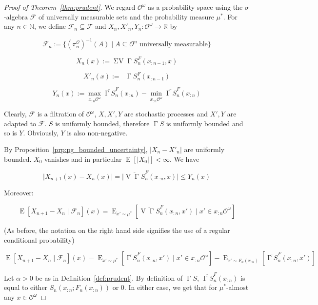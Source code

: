\documentclass[aop,preprint]{imsart}
\numberwithin{equation}{section}
\theoremstyle{definition}
\theoremstyle{plain}
\newcommand{\Nats}{\mathbb{N}}
\newcommand{\Reals}{\mathbb{R}}
\newcommand{\A}[1]{\lvert #1 \rvert}
\DeclareMathOperator{\E}{E}
\newcommand{\Ob}{\mathcal{O}}
\newcommand{\OO}{\Ob^\omega}
\newcommand{\PO}{\pi^\Ob}
\DeclareMathOperator{\V}{V}
\DeclareMathOperator{\SV}{\Sigma V}
\DeclareMathOperator{\SVM}{\Sigma V_{\min}}
\DeclareMathOperator{\PG}{\Gamma}
\newcommand{\F}{\mathcal{F}}
\begin{document}
\begin{proof}[Proof of Theorem~\ref{thm:prudent}]

We regard ${\OO}$ as a probability space using the ${\sigma}$-algebra $\F$ of universally measurable sets and the probability measure ${\mu^*}$. For any ${n \in \Nats}$, we define ${\F_n \subseteq \F}$ and $X_n,X'_n,Y_n: \OO \rightarrow \Reals$ by 

$$\F_n := \{\left(\PO_n\right)^{-1}\left(A\right) \mid A \subseteq \Ob^n \text{ universally measurable}\}$$

$$X_n\left(x\right):= \SV \PG{S}^F_{n}\left(x_{:n-1},x\right)$$

$$X'_n\left(x\right):= \SVM \PG{S}^F_{n}\left(x_{:n-1}\right)$$

$$Y_n\left(x\right):=\max_{x_{:n}\OO} \overline{\PG{S}}^F_{n}\left(x_{:n}\right) - \min_{x_{:n}\OO} \overline{\PG{S}}^F_{n}\left(x_{:n}\right)$$

Clearly, ${\F}$ is a filtration of ${\OO}$, ${X,X',Y}$ are stochastic processes and ${X',Y}$ are adapted to ${\F}$. ${S}$ is uniformly bounded, therefore ${\PG{S}}$  is uniformly bounded and so is ${Y}$. Obviously, ${Y}$ is also non-negative.

By Proposition~\ref{prp:pg_bounded_uncertainty}, ${\A{X_n-X'_n}}$ are uniformly bounded. ${X_0}$ vanishes and in particular ${\E\left[\A{X_0}\right] < \infty}$. We have

$$\A{X_{n+1}\left(x\right)-X_n\left(x\right)} = \A{\overline{\V{\PG{S}}}_{n}^F\left(x_{:n},x\right)} \leq Y_n\left(x\right)$$

Moreover:

$$\E\left[X_{n+1} - X_n \mid \F_n\right]\left(x\right) = \E_{x' \sim \mu^*}\left[\overline{\V{\PG{S}}}_{n}^F\left(x_{:n},x'\right) \mid x' \in x_{:n}\OO\right]$$

(As before, the notation on the right hand side signifies the use of a regular conditional probability)

$$\E\left[X_{n+1} - X_n \mid \F_n\right]\left(x\right) = \E_{x' \sim \mu^*}\left[\overline{\PG{S}}_{n}^F\left(x_{:n},x'\right) \mid x' \in x_{:n}\OO\right] - \E_{x' \sim F_n\left(x_{:n}\right)}\left[\overline{\PG{S}}_{n}^F\left(x_{:n},x'\right)\right]$$

Let $\alpha > 0$ be as in Definition~\ref{def:prudent}. By definition of $\PG{S}$, $\overline{\PG{S}}_{n}^F\left(x_{:n}\right)$ is equal to either $S_n\left(x_{:n};F_n\left(x_{:n}\right)\right)$ or 0. In either case, we get that for $\mu^*$-almost any $x \in \OO$


\end{proof}
\end{document}
